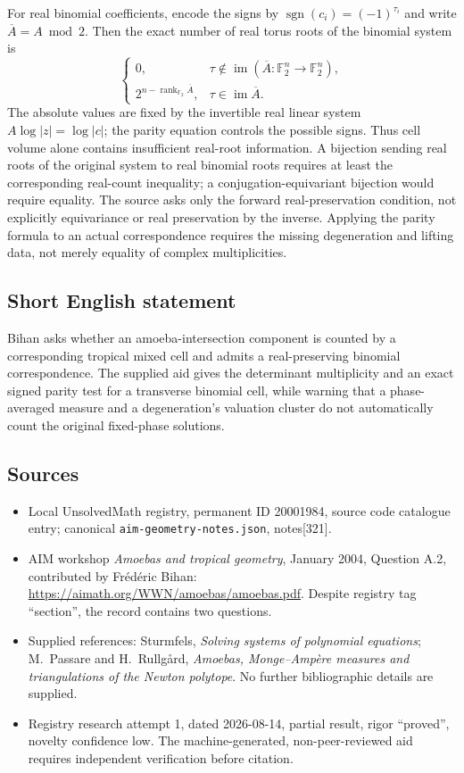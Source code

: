 \documentclass[11pt]{article}
\newcommand{\F}{\mathbb{F}}
\begin{document}
For real binomial coefficients, encode the signs by $\operatorname{sgn}(c_i)=(-1)^{\tau_i}$ and write $\overline A=A\bmod2$. Then the exact number of real torus roots of the binomial system is
\[
 \begin{cases}
 0,&\tau\notin\operatorname{im}(\overline A:\F_2^n\to\F_2^n),\\
 2^{n-\operatorname{rank}_{\F_2}\overline A},
    &\tau\in\operatorname{im}\overline A.
 \end{cases}
\]
The absolute values are fixed by the invertible real linear system $A\log|z|=\log|c|$; the parity equation controls the possible signs. Thus cell volume alone contains insufficient real-root information. A bijection sending real roots of the original system to real binomial roots requires at least the corresponding real-count inequality; a conjugation-equivariant bijection would require equality. The source asks only the forward real-preservation condition, not explicitly equivariance or real preservation by the inverse. Applying the parity formula to an actual correspondence requires the missing degeneration and lifting data, not merely equality of complex multiplicities.
\subsection{Short English statement}
Bihan asks whether an amoeba-intersection component is counted by a corresponding tropical mixed cell and admits a real-preserving binomial correspondence. The supplied aid gives the determinant multiplicity and an exact signed parity test for a transverse binomial cell, while warning that a phase-averaged measure and a degeneration's valuation cluster do not automatically count the original fixed-phase solutions.
\subsection{Sources}
\begin{itemize}
\item Local UnsolvedMath registry, permanent ID 20001984, source code catalogue entry; canonical \texttt{aim-geometry-notes.json}, notes[321].
\item AIM workshop \emph{Amoebas and tropical geometry}, January 2004, Question A.2, contributed by Fr\'ed\'eric Bihan: \url{https://aimath.org/WWN/amoebas/amoebas.pdf}. Despite registry tag ``section'', the record contains two questions.
\item Supplied references: Sturmfels, \emph{Solving systems of polynomial equations}; M.~Passare and H.~Rullg\aa rd, \emph{Amoebas, Monge--Amp\`ere measures and triangulations of the Newton polytope}. No further bibliographic details are supplied.
\item Registry research attempt 1, dated 2026-08-14, partial result, rigor ``proved'', novelty confidence low. The machine-generated, non-peer-reviewed aid requires independent verification before citation.
\end{itemize}
\end{document}
